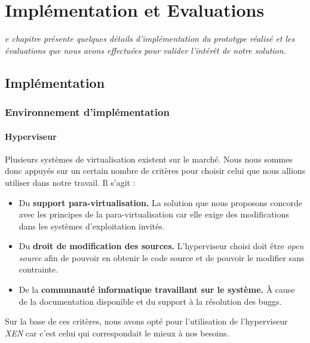 \let\textcircled=\pgftextcircled
\chapter{Implémentation et Evaluations}
\label{chap:implem_eval}

\textit{e chapitre présente quelques détails d’implémentation du prototype réalisé et les évaluations que nous avons effectuées pour valider l’intérêt de notre solution.}

\minitoc

\newpage  
\section{Implémentation}
\subsection{Environnement d'implémentation}

\subsubsection{Hyperviseur}

Plusieurs systèmes de virtualisation existent sur le marché. Nous nous sommes donc appuyés sur un certain nombre de critères pour choisir celui que nous allions utiliser dans notre travail. Il s'agit :
\begin{itemize}[label=]
    \item Du \textbf{support para-virtualisation.} La solution que nous proposons concorde avec les principes de la para-virtualisation car elle exige des modifications dans les systèmes d'exploitation invités.
    \item Du \textbf{droit de modification des sources.} L'hyperviseur choisi doit être \textit{open source} afin de pouvoir en obtenir le code source et de pouvoir le modifier sans contrainte.
    \item De la \textbf{communauté informatique travaillant sur le système.} À cause de la documentation disponible et du support à la résolution des buggs.
\end{itemize}
\noindent Sur la base de ces critères, nous avons opté pour l'utilisation de l'hyperviseur \emph{XEN} \cite{article2} car c'est celui qui correspondait le mieux à nos besoins.

